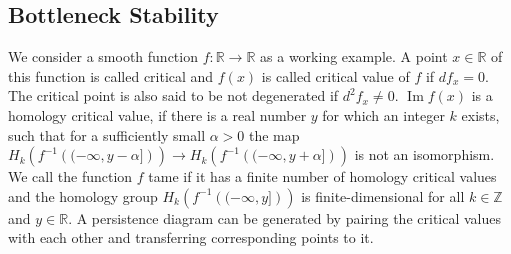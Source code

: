 \documentclass[runningheads]{llncs}
\DeclareMathOperator{\Ima}{\text{Im}}
\begin{document}
\subsection{Bottleneck Stability}
We consider a smooth function $f: \mathbb{R} \rightarrow \mathbb{R}$ as a working example. A point $x \in \mathbb{R}$ of this function is called critical and $f(x)$ is called critical value of $f$ if $df_x = 0$. The critical point is also said to be not degenerated if $d^2f_x \neq 0$. $\Ima f(x)$ is a homology critical value, if there is a real number $y$ for which an integer $k$ exists, such that for a sufficiently small $\alpha > 0$ the map $H_k\left(f^{-1}\left((-\infty,y-\alpha]\right)\right)\rightarrow H_k\left(f^{-1}\left((-\infty,y+\alpha]\right)\right)$ is not an isomorphism. We call the function $f$ tame if it has a finite number of homology critical values and the homology group $H_k\left(f^{-1}\left((-\infty,y]\right)\right)$ is finite-dimensional for all $k\in \mathbb{Z}$ and $y \in \mathbb{R}$. A persistence diagram can be generated by pairing the critical values with each other and transferring corresponding points to it.
\end{document}
